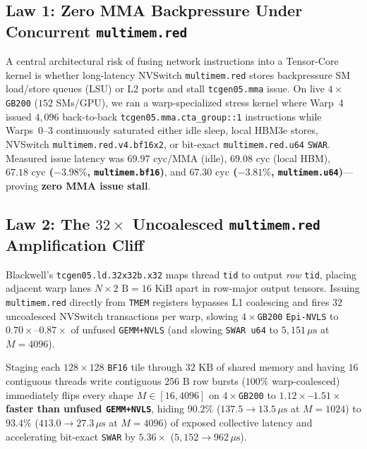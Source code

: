 \documentclass[conference,10pt]{IEEEtran}
\begin{document}
\subsection{Law 1: Zero MMA Backpressure Under Concurrent \texttt{multimem.red}}
A central architectural risk of fusing network instructions into a Tensor-Core kernel is whether long-latency NVSwitch \texttt{multimem.red} stores backpressure SM load/store queues (LSU) or L2 ports and stall \texttt{tcgen05.mma} issue. On live $4{\times}$\texttt{GB200} ($152$ SMs/GPU), we ran a warp-specialized stress kernel where Warp~4 issued $4{,}096$ back-to-back \texttt{tcgen05.mma.cta\_group::1} instructions while Warps~0--3 continuously saturated either idle sleep, local HBM3e stores, NVSwitch \texttt{multimem.red.v4.bf16x2}, or bit-exact \texttt{multimem.red.u64} \texttt{SWAR}. Measured issue latency was $69.97\text{ cyc/MMA}$ (idle), $69.08\text{ cyc}$ (local HBM), \textbf{$67.18\text{ cyc}$ ($-3.98\%$, \texttt{multimem.bf16})}, and \textbf{$67.30\text{ cyc}$ ($-3.81\%$, \texttt{multimem.u64})}---proving \textbf{zero MMA issue stall}.

\subsection{Law 2: The $32\times$ Uncoalesced \texttt{multimem.red} Amplification Cliff}
Blackwell's \texttt{tcgen05.ld.32x32b.x32} maps thread \texttt{tid} to output \emph{row} \texttt{tid}, placing adjacent warp lanes $N \times 2\text{ B} = 16\text{ KiB}$ apart in row-major output tensors. Issuing \texttt{multimem.red} directly from \texttt{TMEM} registers bypasses L1 coalescing and fires $32$ uncoalesced NVSwitch transactions per warp, slowing $4{\times}$\texttt{GB200} \texttt{Epi-NVLS} to $0.70\times$--$0.87\times$ of unfused \texttt{GEMM+NVLS} (and slowing \texttt{SWAR u64} to $5{,}151\,\mu\text{s}$ at $M{=}4096$).

Staging each $128{\times}128$ \texttt{BF16} tile through $32\text{ KB}$ of shared memory and having $16$ contiguous threads write contiguous $256\text{ B}$ row bursts ($100\%$ warp-coalesced) immediately flips every shape $M \in [16, 4096]$ on $4{\times}$\texttt{GB200} to \textbf{$1.12\times$--$1.51\times$ faster than unfused \texttt{GEMM+NVLS}}, hiding \textbf{$90.2\%$} ($137.5 \to 13.5\,\mu\text{s}$ at $M{=}1024$) to \textbf{$93.4\%$} ($413.0 \to 27.3\,\mu\text{s}$ at $M{=}4096$) of exposed collective latency and accelerating bit-exact \texttt{SWAR} by \textbf{$5.36\times$} ($5{,}152 \to 962\,\mu\text{s}$).
\end{document}
